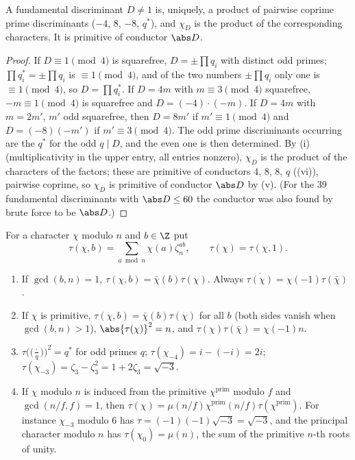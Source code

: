 \begin{corollary}\label{cor:rings:fundamental-primitive}
A fundamental discriminant $D\ne1$ is, uniquely, a product of pairwise coprime prime discriminants ($-4$, $8$, $-8$, $q^*$), and $\chi_D$ is the
product of the corresponding characters. It is primitive of conductor $\abs D$.
\end{corollary}

\begin{proof}
If $D\equiv1\pmod4$ is squarefree, $D=\pm\prod q_i$ with distinct odd primes; $\prod q_i^*=\pm\prod q_i$ is $\equiv1\pmod4$, and of the two numbers $\pm\prod q_i$ only
one is $\equiv1\pmod4$, so $D=\prod q_i^*$. If $D=4m$ with $m\equiv3\pmod4$ squarefree, $-m\equiv1\pmod4$ is squarefree and $D=(-4)\cdot(-m)$. If $D=4m$ with
$m=2m'$, $m'$ odd squarefree, then $D=8m'$ if $m'\equiv1\pmod4$ and $D=(-8)(-m')$ if $m'\equiv3\pmod4$. The odd prime discriminants occurring are the
$q^*$ for the odd $q\mid D$, and the even one is then determined. By (i) (multiplicativity in the upper entry,
all entries nonzero), $\chi_D$ is the product of the characters of the factors; these are primitive of conductors $4$, $8$, $8$, $q$
((vi)), pairwise coprime, so $\chi_D$ is primitive of conductor $\abs D$ by (v). (For the $39$
fundamental discriminants with $\abs D\le60$ the conductor was also found by brute force to be $\abs D$.)
\end{proof}

\begin{theorem}\label{thm:rings:gauss-sums}
For a character $\chi$ modulo $n$ and $b\in\Z$ put
\[
\tau(\chi,b)=\sum_{a\bmod n}\chi(a)\zeta_n^{ab},\qquad\tau(\chi)=\tau(\chi,1).
\]
\begin{enumerate}[label=(\roman*)]
\item If $\gcd(b,n)=1$, $\tau(\chi,b)=\bar\chi(b)\tau(\chi)$. Always $\overline{\tau(\chi)}=\chi(-1)\tau(\bar\chi)$.
\item If $\chi$ is primitive, $\tau(\chi,b)=\bar\chi(b)\tau(\chi)$ for all $b$ (both sides vanish when $\gcd(b,n)>1$), $\abs{\tau(\chi)}^2=n$, and $\tau(\chi)\tau(\bar\chi)=\chi(-1)n$.
\item $\tau\bigl(\bigl(\frac\cdot q\bigr)\bigr)^2=q^*$ for odd primes $q$; $\tau(\chi_{-4})=i-(-i)=2i$; $\tau(\chi_{-3})=\zeta_3-\zeta_3^2=1+2\zeta_3=\sqrt{-3}$.
\item If $\chi$ modulo $n$ is induced from the primitive $\chi^{\mathrm{prim}}$ modulo $f$ and $\gcd(n/f,f)=1$, then
$\tau(\chi)=\mu(n/f)\chi^{\mathrm{prim}}(n/f)\tau(\chi^{\mathrm{prim}})$. For instance $\chi_{-3}$ modulo $6$ has $\tau=(-1)(-1)\sqrt{-3}=\sqrt{-3}$, and the principal character modulo $n$
has $\tau(\chi_0)=\mu(n)$, the sum of the primitive $n$-th roots of unity.
\end{enumerate}
\end{theorem}


